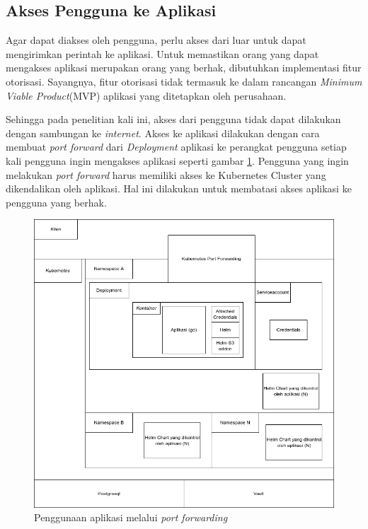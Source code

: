 \newpage

\subsection{Akses Pengguna ke Aplikasi}

Agar dapat diakses oleh pengguna, perlu akses dari luar untuk dapat mengirimkan perintah ke aplikasi. Untuk memastikan orang yang dapat mengakses aplikasi merupakan orang yang berhak, dibutuhkan implementasi fitur otorisasi. Sayangnya, fitur otorisasi tidak termasuk ke dalam rancangan \textit{Minimum Viable Product}(MVP) aplikasi yang ditetapkan oleh perusahaan.

Sehingga pada penelitian kali ini, akses dari pengguna tidak dapat dilakukan dengan sambungan ke \textit{internet}. Akses ke aplikasi dilakukan dengan cara membuat \textit{port forward} dari \textit{Deployment} aplikasi ke perangkat pengguna setiap kali pengguna ingin mengakses aplikasi seperti gambar \ref{fig:arsitekturFinalAplikasi}. Pengguna yang ingin melakukan \textit{port forward} harus memiliki akses ke Kubernetes Cluster yang dikendalikan oleh aplikasi. Hal ini dilakukan untuk membatasi akses aplikasi ke pengguna yang berhak.


\begin{figure}
	\centering
	\includegraphics[width=1\textwidth]{pics/ArsitekturFinalAplikasi.png}
	\caption{Penggunaan aplikasi melalui \textit{port forwarding}}
	\label{fig:arsitekturFinalAplikasi}
\end{figure}



